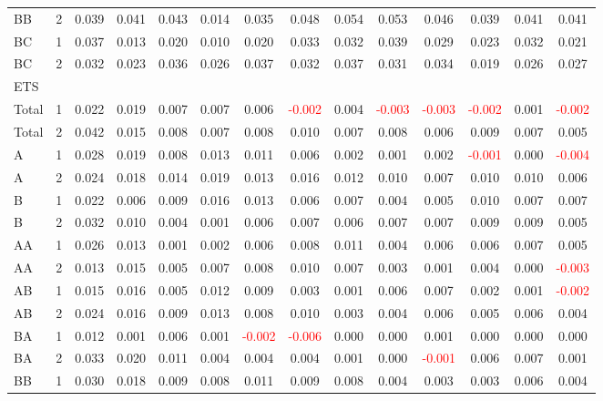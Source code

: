 \begin{table}[H]
{\begin{tabular}{llcccccccccccc}
BB & 2 & 0.039 & 0.041 & 0.043 & 0.014 & 0.035 & 0.048 & 0.054 & 0.053 & 0.046 & 0.039 & 0.041 & 0.041\\
BC & 1 & 0.037 & 0.013 & 0.020 & 0.010 & 0.020 & 0.033 & 0.032 & 0.039 & 0.029 & 0.023 & 0.032 & 0.021\\
BC & 2 & 0.032 & 0.023 & 0.036 & 0.026 & 0.037 & 0.032 & 0.037 & 0.031 & 0.034 & 0.019 & 0.026 & 0.027\\
\hline
ETS &  &  &  &  &  &  &  &  &  &  &  &  & \\
\hline
Total & 1 & 0.022 & 0.019 & 0.007 & 0.007 & 0.006 & \textcolor{red}{-0.002} & 0.004 & \textcolor{red}{-0.003} & \textcolor{red}{-0.003} & \textcolor{red}{-0.002} & 0.001 & \textcolor{red}{-0.002}\\
Total & 2 & 0.042 & 0.015 & 0.008 & 0.007 & 0.008 & 0.010 & 0.007 & 0.008 & 0.006 & 0.009 & 0.007 & 0.005\\
A & 1 & 0.028 & 0.019 & 0.008 & 0.013 & 0.011 & 0.006 & 0.002 & 0.001 & 0.002 & \textcolor{red}{-0.001} & 0.000 & \textcolor{red}{-0.004}\\
A & 2 & 0.024 & 0.018 & 0.014 & 0.019 & 0.013 & 0.016 & 0.012 & 0.010 & 0.007 & 0.010 & 0.010 & 0.006\\
B & 1 & 0.022 & 0.006 & 0.009 & 0.016 & 0.013 & 0.006 & 0.007 & 0.004 & 0.005 & 0.010 & 0.007 & 0.007\\
B & 2 & 0.032 & 0.010 & 0.004 & 0.001 & 0.006 & 0.007 & 0.006 & 0.007 & 0.007 & 0.009 & 0.009 & 0.005\\
AA & 1 & 0.026 & 0.013 & 0.001 & 0.002 & 0.006 & 0.008 & 0.011 & 0.004 & 0.006 & 0.006 & 0.007 & 0.005\\
AA & 2 & 0.013 & 0.015 & 0.005 & 0.007 & 0.008 & 0.010 & 0.007 & 0.003 & 0.001 & 0.004 & 0.000 & \textcolor{red}{-0.003}\\
AB & 1 & 0.015 & 0.016 & 0.005 & 0.012 & 0.009 & 0.003 & 0.001 & 0.006 & 0.007 & 0.002 & 0.001 & \textcolor{red}{-0.002}\\
AB & 2 & 0.024 & 0.016 & 0.009 & 0.013 & 0.008 & 0.010 & 0.003 & 0.004 & 0.006 & 0.005 & 0.006 & 0.004\\
BA & 1 & 0.012 & 0.001 & 0.006 & 0.001 & \textcolor{red}{-0.002} & \textcolor{red}{-0.006} & 0.000 & 0.000 & 0.001 & 0.000 & 0.000 & 0.000\\
BA & 2 & 0.033 & 0.020 & 0.011 & 0.004 & 0.004 & 0.004 & 0.001 & 0.000 & \textcolor{red}{-0.001} & 0.006 & 0.007 & 0.001\\
BB & 1 & 0.030 & 0.018 & 0.009 & 0.008 & 0.011 & 0.009 & 0.008 & 0.004 & 0.003 & 0.003 & 0.006 & 0.004\\

\end{tabular}}
\end{table}
